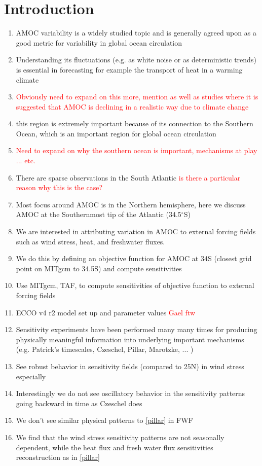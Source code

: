 \documentclass[a4paper,11pt]{article}
\newcommand{\red}[1]{\textcolor{red}{#1}}
\begin{document}
\section{Introduction} 
\label{intro}
	
	\begin{enumerate} 

	AMOC variability 
	  \item AMOC variability is a widely studied topic and is generally agreed upon as a good metric for variability in global ocean circulation 
	  \item Understanding its fluctuations (e.g. as white noise or as deterministic trends) is essential in forecasting for example the transport of heat in a warming climate
	  \item \red{Obviously need to expand on this more, mention \cite{wunschAndHeimbach_AMOC} as well as studies where it is suggested that AMOC is declining in a realistic way due to climate change} 
	  \item this region is extremely important because of its connection to the Southern Ocean, which is an important region for global ocean circulation 
	  \item \red{Need to expand on why the southern ocean is important, mechanisms at play ... etc.}
	  \item There are sparse observations in the South Atlantic \red{is there a particular reason why this is the case?}
	  \item Most focus around AMOC is in the Northern hemisphere, here we discuss AMOC at the Southernmost tip of the Atlantic (34.5$^{\circ}$S)
	  \item We are interested in attributing variation in AMOC to external forcing fields such as wind stress, heat, and freshwater fluxes.
	  \item We do this by defining an objective function for AMOC at 34S (closest grid point on MITgcm to 34.5S) and compute sensitivities 
	  \item Use MITgcm, TAF, to compute sensitivities of objective function to external forcing fields
	  \item ECCO v4 r2 model set up and parameter values \red{Gael ftw}
	  \item Sensitivity experiments have been performed many many times for producing physically meaningful information into underlying important mechanisms (e.g. Patrick's timescales, Czeschel, Pillar, Marotzke, ... )
	  \item See robust behavior in sensitivity fields (compared to 25N) in wind stress especially 
	  \item Interestingly we do not see oscillatory behavior in the sensitivity patterns going backward in time as Czeschel does
	  \item We don't see similar physical patterns to \ref{pillar} in FWF
	  \item We find that the wind stress sensitivity patterns are not seasonally dependent, while the heat flux and fresh water flux sensitivities  reconstruction as in \ref{pillar}
 
	\end{enumerate} 
\end{document}
